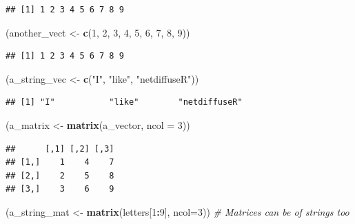 \documentclass[]{book}
\newenvironment{Shaded}{\begin{snugshade}}{\end{snugshade}}
\newcommand{\CommentTok}[1]{\textcolor[rgb]{0.56,0.35,0.01}{\textit{#1}}}
\newcommand{\DataTypeTok}[1]{\textcolor[rgb]{0.13,0.29,0.53}{#1}}
\newcommand{\DecValTok}[1]{\textcolor[rgb]{0.00,0.00,0.81}{#1}}
\newcommand{\KeywordTok}[1]{\textcolor[rgb]{0.13,0.29,0.53}{\textbf{#1}}}
\newcommand{\NormalTok}[1]{#1}
\newcommand{\OperatorTok}[1]{\textcolor[rgb]{0.81,0.36,0.00}{\textbf{#1}}}
\newcommand{\StringTok}[1]{\textcolor[rgb]{0.31,0.60,0.02}{#1}}
\begin{document}
\begin{enumerate}
\begin{verbatim}
## [1] 1 2 3 4 5 6 7 8 9
\end{verbatim}

\begin{Shaded}
\begin{Highlighting}[]
\NormalTok{(another_vect <-}\StringTok{ }\KeywordTok{c}\NormalTok{(}\DecValTok{1}\NormalTok{, }\DecValTok{2}\NormalTok{, }\DecValTok{3}\NormalTok{, }\DecValTok{4}\NormalTok{, }\DecValTok{5}\NormalTok{, }\DecValTok{6}\NormalTok{, }\DecValTok{7}\NormalTok{, }\DecValTok{8}\NormalTok{, }\DecValTok{9}\NormalTok{))}
\end{Highlighting}
\end{Shaded}

\begin{verbatim}
## [1] 1 2 3 4 5 6 7 8 9
\end{verbatim}

\begin{Shaded}
\begin{Highlighting}[]
\NormalTok{(a_string_vec <-}\StringTok{ }\KeywordTok{c}\NormalTok{(}\StringTok{"I"}\NormalTok{, }\StringTok{"like"}\NormalTok{, }\StringTok{"netdiffuseR"}\NormalTok{))}
\end{Highlighting}
\end{Shaded}

\begin{verbatim}
## [1] "I"           "like"        "netdiffuseR"
\end{verbatim}

\begin{Shaded}
\begin{Highlighting}[]
\NormalTok{(a_matrix     <-}\StringTok{ }\KeywordTok{matrix}\NormalTok{(a_vector, }\DataTypeTok{ncol =} \DecValTok{3}\NormalTok{))}
\end{Highlighting}
\end{Shaded}

\begin{verbatim}
##      [,1] [,2] [,3]
## [1,]    1    4    7
## [2,]    2    5    8
## [3,]    3    6    9
\end{verbatim}

\begin{Shaded}
\begin{Highlighting}[]
\NormalTok{(a_string_mat <-}\StringTok{ }\KeywordTok{matrix}\NormalTok{(letters[}\DecValTok{1}\OperatorTok{:}\DecValTok{9}\NormalTok{], }\DataTypeTok{ncol=}\DecValTok{3}\NormalTok{)) }\CommentTok{# Matrices can be of strings too}
\end{Highlighting}
\end{Shaded}


\end{enumerate}
\end{document}
